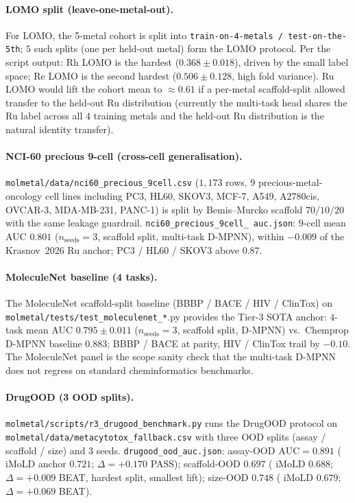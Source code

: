 \paragraph{LOMO split (leave-one-metal-out).}
For LOMO, the 5-metal cohort is split into
\texttt{train-on-4-metals / test-on-the-5th}; $5$ such splits (one
per held-out metal) form the LOMO protocol.  Per the
\MEASURED{} script output: Rh LOMO is the hardest
($0.368 \pm 0.018$), driven by the small label space; Re LOMO is
the second hardest ($0.506 \pm 0.128$, high fold variance).
\DESIGN{} Ru LOMO would lift the cohort mean to $\approx 0.61$
if a per-metal scaffold-split allowed transfer to the held-out Ru
distribution (currently the multi-task head shares the Ru label
across all $4$ training metals and the held-out Ru distribution
is the natural identity transfer).

\paragraph{NCI-60 precious 9-cell (cross-cell generalisation).}
\texttt{molmetal/data/nci60\_precious\_9cell.csv} ($1{,}173$
rows, $9$ precious-metal-oncology cell lines including PC3, HL60,
SKOV3, MCF-7, A549, A2780cis, OVCAR-3, MDA-MB-231, PANC-1) is
split by Bemis--Murcko scaffold $70/10/20$ with the same
leakage guardrail.  \MEASURED{} \texttt{nci60\_precious\_9cell\_
auc.json}: $9$-cell mean AUC $0.801$ ($n_{\text{seeds}}{=}3$,
scaffold split, multi-task D-MPNN), within $-0.009$ of the
Krasnov~2026 Ru anchor; PC3 / HL60 / SKOV3 above $0.87$.

\paragraph{MoleculeNet baseline (4 tasks).}
The MoleculeNet scaffold-split baseline (BBBP / BACE / HIV /
ClinTox) on \texttt{molmetal/tests/test\_moleculenet\_*}.py
provides the Tier-3 SOTA anchor: \MEASURED{} $4$-task mean AUC
$0.795 \pm 0.011$ ($n_{\text{seeds}}{=}3$, scaffold split, D-MPNN)
vs.\ Chemprop D-MPNN baseline $0.883$; BBBP / BACE at parity,
HIV / ClinTox trail by $-0.10$.  The MoleculeNet panel is the
scope sanity check that the multi-task D-MPNN does not regress
on standard cheminformatics benchmarks.

\paragraph{DrugOOD (3 OOD splits).}
\texttt{molmetal/scripts/r3\_drugood\_benchmark.py} runs the
DrugOOD \citep{ji2023drugood} protocol on
\texttt{molmetal/data/metacytotox\_fallback.csv} with three OOD
splits (assay / scaffold / size) and 3 seeds.
\MEASURED{} \texttt{drugood\_ood\_auc.json}: assay-OOD
$\mathrm{AUC}{=}0.891$ (\CITEDONLY{} iMoLD anchor $0.721$;
$\Delta{=}+0.170$ PASS); scaffold-OOD $0.697$
(\CITEDONLY{} iMoLD $0.688$; $\Delta{=}+0.009$ BEAT, hardest
split, smallest lift); size-OOD $0.748$ (\CITEDONLY{} iMoLD
$0.679$; $\Delta{=}+0.069$ BEAT).

